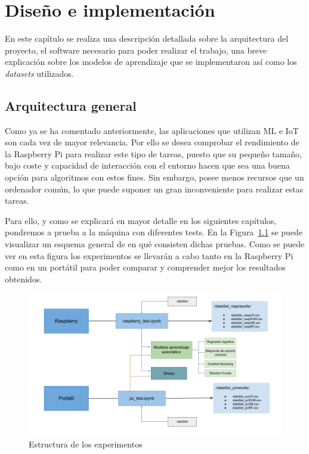\documentclass[a4paper, 12pt]{book}
\begin{document}
\cleardoublepage


\chapter{Diseño e implementación}
\label{chap:diseño}

En este capítulo se realiza una descripción detallada sobre la arquitectura del proyecto, el software necesario para poder realizar el trabajo, una breve explicación sobre los modelos de aprendizaje que se implementaron así como los \textit{datasets} utilizados.

\section{Arquitectura general} 
\label{sec:arquitectura}

Como ya se ha comentado anteriormente, las aplicaciones que utilizan ML e IoT son cada vez de mayor relevancia. Por ello se desea comprobar el rendimiento de la Raspberry Pi para realizar este tipo de tareas, puesto que su pequeño tamaño, bajo coste y capacidad de interacción con el entorno hacen que sea una buena opción para algoritmos con estos fines. Sin embargo, posee menos recursos que un ordenador común, lo que puede suponer un gran inconveniente para realizar estas tareas. 

Para ello, y como se explicará en mayor detalle en los siguientes capítulos, pondremos a prueba a la máquina con diferentes tests. En la Figura~\ref{fig:arquitectura} se puede visualizar un esquema general de en qué consisten dichas pruebas. Como se puede ver en esta figura los experimentos se llevarán a cabo tanto en la Raspberry Pi como en un portátil para poder comparar y comprender mejor los resultados obtenidos.


\begin{figure}[htb]
  \centering
  \includegraphics[width=15cm, keepaspectratio]{img/arquitectura_general.png}
  \caption{Estructura de los experimentos}\label{fig:arquitectura}
\end{figure}
\end{document}
